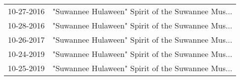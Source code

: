 \begin{supertabular}{ll}
 10-27-2016 &  "Suwannee Hulaween" Spirit of the Suwannee Mus... \\
 10-28-2016 &  "Suwannee Hulaween" Spirit of the Suwannee Mus... \\
 10-26-2017 &  "Suwannee Hulaween" Spirit of the Suwannee Mus... \\
 10-24-2019 &  "Suwannee Hulaween" Spirit of the Suwannee Mus... \\
 10-25-2019 &  "Suwannee Hulaween" Spirit of the Suwannee Mus... \\
\end{supertabular}

